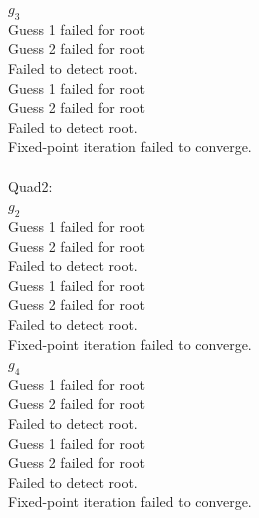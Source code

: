 \documentclass[journal]{IEEEtran}
\numberwithin{equation}{enumi}
\numberwithin{figure}{enumi}
\begin{document}
\begin{enumerate}
\begin{itemize}
\begin{multicols}{2}
        $g_3$\\
        Guess 1 failed for root\\
        Guess 2 failed for root\\
        Failed to detect root.\\
        Guess 1 failed for root\\
        Guess 2 failed for root\\
        Failed to detect root.\\
        Fixed-point iteration failed to converge.\\
        \columnbreak
        \\
        Quad2:\\
        $g_2$\\
        Guess 1 failed for root\\
        Guess 2 failed for root\\
        Failed to detect root.\\
        Guess 1 failed for root\\
        Guess 2 failed for root\\
        Failed to detect root.\\
        Fixed-point iteration failed to converge.\\
        $g_4$\\
        Guess 1 failed for root\\
        Guess 2 failed for root\\
        Failed to detect root.\\
        Guess 1 failed for root\\
        Guess 2 failed for root\\
        Failed to detect root.\\
        Fixed-point iteration failed to converge.\\
        \end{multicols}


\end{itemize}
\end{enumerate}
\end{document}
